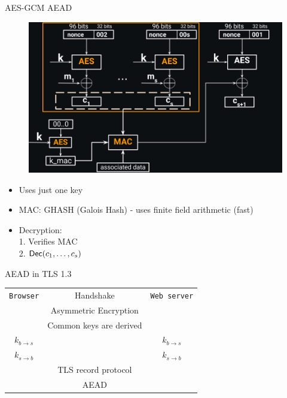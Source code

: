 \documentclass[usenames,dvipsnames, 9pt]{beamer}
\begin{document}
\begin{frame}{AES-GCM AEAD}
\begin{figure}
	\includegraphics[width=0.7\linewidth]{AES_GCM_AEAD_full}
\end{figure}

\begin{itemize}
	\item Uses just one key
	\item MAC: GHASH (Galois Hash) - uses finite field arithmetic (fast)
	\item Decryption: \\
	1. Verifies MAC \\
	2. $\textsf{Dec}(c_1, \ldots, c_s)$
\end{itemize}

\end{frame}
\begin{frame}{AEAD in TLS 1.3}
	\LARGE
	\begin{center}
		\begin{tabular}{c c c }
			\texttt{Browser}&  {\color{Orange}{Phase 1} Handshake}   & \texttt{Web server}  \\
			& {\Large Asymmetric Encryption}  & \\ 
			& {\Large Common keys are derived}  & \\ 
			$k_{b\rightarrow s}$&  & $k_{b\rightarrow s}$\\ 
			$k_{s\rightarrow b}$&  & $k_{s\rightarrow b}$ \pause \\ 
			&  {\color{Orange}{Phase 2} TLS record protocol}   &  \\
			& {\Large AEAD}  & \\ 
		\end{tabular}
	\end{center}
\end{frame}
\end{document}
